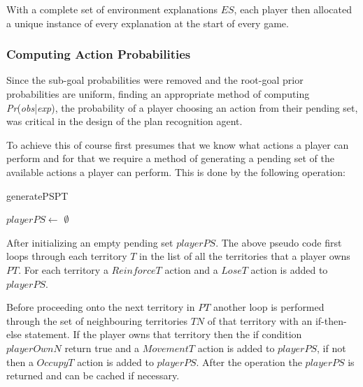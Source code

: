 \documentclass[parskip]{cs4rep}
\begin{document}
With a complete set of environment explanations $ES$, each player then allocated a unique instance of every explanation at the start of every game. 

\subsubsection{Computing Action Probabilities}

Since the sub-goal probabilities were removed and the root-goal prior probabilities are uniform, finding an appropriate method of computing \textit{Pr}(\textit{obs}|\textit{exp}), the probability of a player choosing an action from their pending set, was critical in the design of the plan recognition agent. 

To achieve this of course first presumes that we know what actions a player can perform and for that we require a method of generating a pending set of the available actions a player can perform. This is done by the following operation:

\begin{pseudocode}[ruled]{generatePS}{PT}
\begin{algorithm}[H]

$playerPS \gets $ $\emptyset$

\end{algorithm}
\end{pseudocode}

After initializing an empty pending set $playerPS$. The above pseudo code first loops through each territory $T$ in the list of all the territories that a player owns $PT$. For each territory a $ReinforceT$ action and a $LoseT$ action is added to $playerPS$. 

Before proceeding onto the next territory in $PT$ another loop is performed through the set of neighbouring territories $TN$ of that territory with an if-then-else statement. If the player owns that territory then the if condition $playerOwnN$ return true and a $MovementT$ action is added to $playerPS$, if not then a $OccupyT$ action is added to $playerPS$. After the operation the $playerPS$ is returned and can be cached if necessary.
\end{document}
